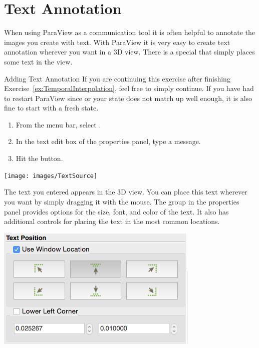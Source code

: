 \section{Text Annotation}


When using ParaView as a communication tool it is often helpful to annotate
the images you create with text.  With ParaView it is very easy to create
text annotation wherever you want in a 3D view.  There is a special
 that simply places some text in the view.

\begin{exercise}{Adding Text Annotation}
  \label{ex:AddingTextAnnotation}%
  If you are continuing this exercise after finishing
  Exercise~\ref{ex:TemporalInterpolation}, feel free to simply continue.
  If you have had to restart ParaView since or your state does not match up
  well enough, it is also fine to start with a fresh state.

  \begin{enumerate}
  \item From the menu bar, select  \ra {}.
  \item In the text edit box of the properties panel, type a message.
  \item Hit the \apply button.
  \end{enumerate}

  \begin{inlinefig}
    \texttt{[image: images/TextSource]}
  \end{inlinefig}

  The text you entered appears in the 3D view.  You can place this text
  wherever you want by simply dragging it with the mouse.  The
   group in the properties panel provides options for
  the size, font, and color of the text.  It also has additional controls
  for placing the text in the most common locations.

  \begin{inlinefig}
    \includegraphics[width=.66\scw]{images/TextPosition}
  \end{inlinefig}
\end{exercise}

